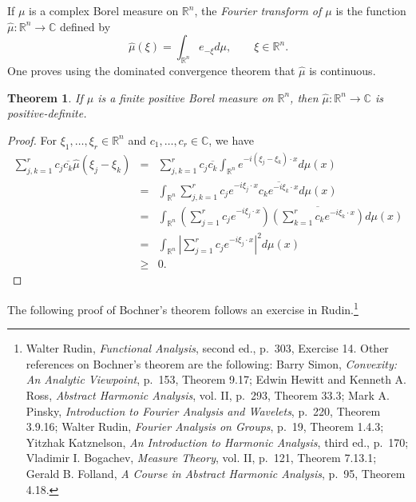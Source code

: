 \documentclass{article}
\newtheorem{theorem}{Theorem}
\theoremstyle{definition}
\begin{document}
If $\mu$ is a complex Borel measure on $\mathbb{R}^n$, the {\em Fourier transform of $\mu$} is the function
$\hat{\mu}:\mathbb{R}^n \to \mathbb{C}$ defined by
\[
\hat{\mu}(\xi) = \int_{\mathbb{R}^n} e_{-\xi} d\mu, \qquad \xi \in \mathbb{R}^n.
\]
One proves using the dominated convergence theorem that $\hat{\mu}$ is continuous.

\begin{theorem}
If $\mu$ is a finite positive Borel measure on $\mathbb{R}^n$, then $\hat{\mu}:\mathbb{R}^n \to \mathbb{C}$ is positive-definite.
\end{theorem}
\begin{proof}
For $\xi_1,\ldots,\xi_r \in \mathbb{R}^n$ and $c_1,\ldots,c_r \in \mathbb{C}$, we have
\begin{eqnarray*}
\sum_{j,k=1}^r c_j \overline{c_k} \hat{\mu}(\xi_j-\xi_k)&=&\sum_{j,k=1}^r c_j \overline{c_k} \int_{\mathbb{R}^n}
e^{-i(\xi_j-\xi_k)\cdot x} d\mu(x)\\
&=&\int_{\mathbb{R}^n} \sum_{j,k=1}^r c_j e^{-i\xi_j\cdot x} \overline{c_k e^{-i \xi_k \cdot x}} d\mu(x)\\
&=&\int_{\mathbb{R}^n} \left( \sum_{j=1}^r c_j e^{-i\xi_j\cdot x} \right)
\overline{\left( \sum_{k=1}^r c_k e^{-i\xi_k\cdot x} \right)}
 d\mu(x)\\
 &=&\int_{\mathbb{R}^n} \left| \sum_{j=1}^r c_j e^{-i\xi_j\cdot x} \right|^2 d\mu(x)\\
 &\geq&0.
\end{eqnarray*}
\end{proof}




The following proof of Bochner's theorem follows an exercise in Rudin.\footnote{Walter Rudin, {\em Functional Analysis}, second ed., p.~303, Exercise 14.
Other references on Bochner's theorem are the following:  Barry Simon, {\em Convexity: An Analytic Viewpoint}, p.~153, Theorem 9.17;
Edwin Hewitt and Kenneth A. Ross, {\em Abstract Harmonic Analysis}, vol. II, p.~293, Theorem 33.3; 
Mark A. Pinsky, {\em Introduction to Fourier Analysis and Wavelets}, p.~220, Theorem 3.9.16; Walter Rudin, {\em Fourier Analysis on Groups}, p.~19, Theorem 1.4.3;
Yitzhak Katznelson, {\em An Introduction to Harmonic Analysis}, third ed., p.~170; Vladimir I. Bogachev, {\em Measure Theory},
vol. II, p.~121, Theorem 7.13.1; Gerald B. Folland, {\em A Course in Abstract Harmonic Analysis}, p.~95,
Theorem 4.18.}
\end{document}
